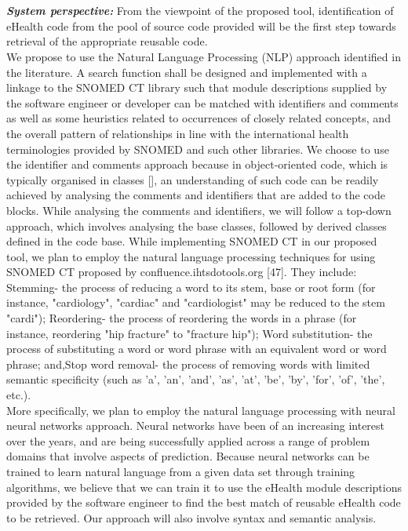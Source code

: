 \documentclass[a4paper]{article}
\begin{document}
 \\ \\
\textit{\textbf{System perspective:}} From the viewpoint of the proposed tool, identification of eHealth code from the pool of source code provided will be the first step towards retrieval of the appropriate reusable code. \\
We propose to use the Natural Language Processing (NLP) approach identified in the literature. A  search function shall be designed and implemented with a linkage to the SNOMED CT library such that module descriptions supplied by the software engineer or developer can be matched with identifiers and comments as well as some heuristics related to occurrences of closely related concepts, and the overall pattern of relationships in line with the international health terminologies provided by SNOMED and such other libraries. We choose to use the identifier and comments approach because in object-oriented code, which is typically organised in classes [], an understanding of such code can be readily achieved by analysing the comments and identifiers that are added to the code blocks. While analysing the comments and identifiers, we will follow a top-down approach, which involves analysing the base classes, followed by derived classes defined in the code base. While implementing SNOMED CT in our proposed tool, we plan to employ the natural language processing techniques for using SNOMED CT proposed by confluence.ihtsdotools.org [47]. They include: Stemming- the process of reducing a word to its stem, base or root form (for instance, "cardiology", "cardiac" and "cardiologist" may be reduced to the stem "cardi"); Reordering- the process of reordering the words in a phrase (for instance, reordering "hip fracture" to "fracture hip"); Word substitution- the process of substituting a word or word phrase with an equivalent word or word phrase; and,Stop word removal- the process of removing words with limited semantic specificity (such as 'a', 'an', 'and', 'as', 'at', 'be', 'by', 'for', 'of', 'the', etc.). \\ 
More specifically, we plan to employ the natural language processing with neural neural networks approach. Neural networks have been of an increasing interest over the years, and are being successfully applied across a range of problem domains that involve aspects of prediction. Because neural networks can be trained to learn natural language from a given data set through training algorithms, we believe that we can train it to use the eHealth module descriptions provided by the software engineer to find the best match of reusable eHealth code to be retrieved. Our approach will also involve syntax and semantic analysis. \\ \\
\end{document}
